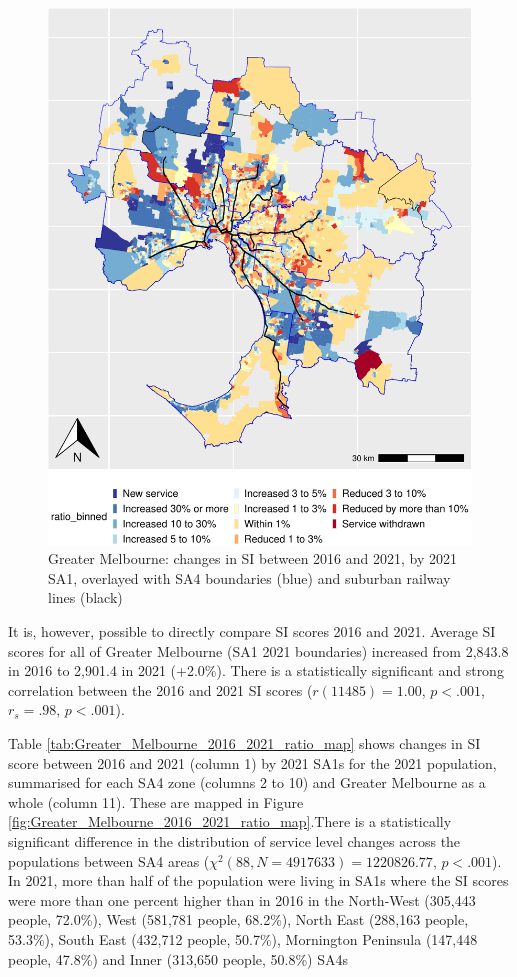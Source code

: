 \documentclass[preprint, 3p,
authoryear]{elsarticle} %
\begin{document}
\begin{figure}
\centering
\includegraphics{ReynoldsCurrieQu2024_files/figure-latex/Greater_Melbourne_2016_2021_ratio_map-1.pdf}
\caption{Greater Melbourne: changes in SI between 2016 and 2021, by 2021
SA1, overlayed with SA4 boundaries (blue) and suburban railway lines
(black)}
\end{figure}

It is, however, possible to directly compare SI scores 2016 and 2021.
Average SI scores for all of Greater Melbourne (SA1 2021 boundaries)
increased from 2,843.8 in 2016 to 2,901.4 in 2021 (+2.0\%). There is a
statistically significant and strong correlation between the 2016 and
2021 SI scores (\(r(11485) = 1.00\), \(p < .001\), \(r_s =.98\),
\(p < .001\)).

Table \ref{tab:Greater_Melbourne_2016_2021_ratio_map} shows changes in
SI score between 2016 and 2021 (column 1) by 2021 SA1s for the 2021
population, summarised for each SA4 zone (columns 2 to 10) and Greater
Melbourne as a whole (column 11). These are mapped in Figure
\ref{fig:Greater_Melbourne_2016_2021_ratio_map}.There is a statistically
significant difference in the distribution of service level changes
across the populations between SA4 areas
(\(\chi^2(88, N = 4917633) = 1220826.77\), \(p < .001\)). In 2021, more
than half of the population were living in SA1s where the SI scores were
more than one percent higher than in 2016 in the North-West (305,443
people, 72.0\%), West (581,781 people, 68.2\%), North East (288,163
people, 53.3\%), South East (432,712 people, 50.7\%), Mornington
Peninsula (147,448 people, 47.8\%) and Inner (313,650 people, 50.8\%)
SA4s
\end{document}
